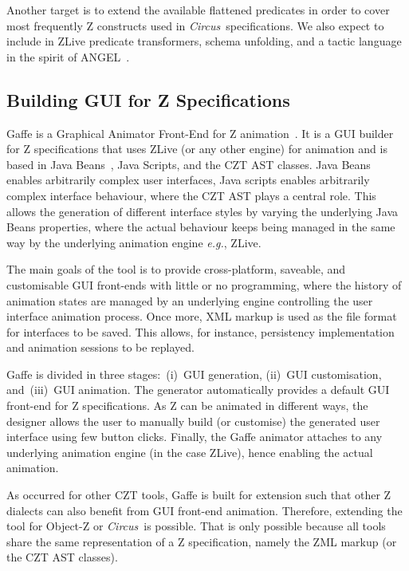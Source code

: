 \documentclass{llncs}
\newcommand{\Circus}{{\sf\slshape Circus}}
\begin{document}
    Another target is to extend the available flattened predicates in order to cover most
    frequently Z constructs used in \Circus\ specifications.
    We also expect to include in ZLive predicate transformers, schema unfolding, and a
    tactic language in the spirit of ANGEL~\cite{z.others:angel}.

\subsection{Building GUI for Z Specifications}

    Gaffe is a Graphical Animator Front-End for Z animation~\cite{daley2003}.
    It is a GUI builder for Z specifications that uses ZLive (or any other engine)
    for animation and is based in Java Beans~\cite{javabeans}, Java Scripts, and the CZT AST classes.
    Java Beans enables arbitrarily complex user interfaces, Java scripts enables
    arbitrarily complex interface behaviour, where the CZT AST plays a central role.
    This allows the generation of different interface styles by varying the underlying
    Java Beans properties, where the actual behaviour keeps being managed in the same way
    by the underlying animation engine \textit{e.g.}, ZLive.

    The main goals of the tool is to provide cross-platform, saveable, and
    customisable GUI front-ends with little or no programming, where the
    history of animation states are managed by an underlying engine controlling the
    user interface animation process.
    Once more, XML markup is used as the file format for interfaces to be saved.
    This allows, for instance, persistency implementation and animation sessions
    to be replayed.

    Gaffe is divided in three stages:~(i)~GUI generation, (ii)~GUI customisation,
    and~(iii)~GUI animation. The generator automatically provides a default GUI front-end
    for Z specifications. As Z can be animated in different ways, the designer allows the
    user to manually build (or customise) the generated user interface using few button clicks.
    Finally, the Gaffe animator attaches to any underlying animation engine (in the case ZLive),
    hence enabling the actual animation.

    As occurred for other CZT tools, Gaffe is built for extension such that other Z dialects
    can also benefit from GUI front-end animation. Therefore, extending the tool for Object-Z
    or \Circus\ is possible. That is only possible because all tools share the same
    representation of a Z specification, namely the ZML markup (or the CZT AST classes).
\end{document}
